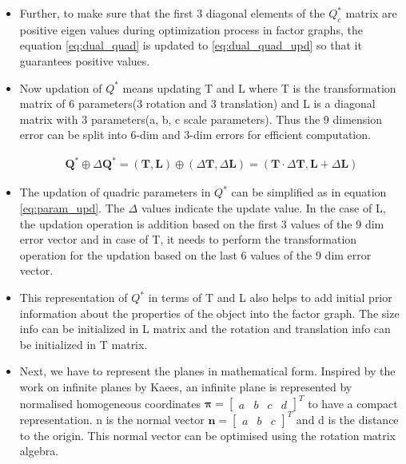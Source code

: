 \documentclass[report.tex]{subfiles}
\begin{document}
\begin{itemize}
\item Further, to make sure that the first 3 diagonal elements of the ${Q}_{c}^{*}$ matrix are positive eigen values during optimization process in factor graphs, the equation \ref{eq:dual_quad} is updated to \ref{eq:dual_quad_upd} so that it guarantees positive values.
\item Now updation of ${Q}^{*}$ means updating T and L where T is the transformation matrix of 6 parameters(3 rotation and 3 translation) and L is a diagonal matrix with 3 parameters(a, b, c scale parameters). Thus the 9 dimension error can be split into 6-dim and 3-dim errors for efficient computation.

\begin{equation}
{
\begin{aligned}
\mathbf{Q}^{*} \oplus \Delta \mathbf{Q}^{*}=(\mathbf{T}, \mathbf{L}) \oplus(\Delta \mathbf{T}, \Delta \mathbf{L})=(\mathbf{T} \cdot \Delta \mathbf{T}, \mathbf{L}+\Delta \mathbf{L})
\end{aligned}
} \label{eq:param_upd}
\end{equation}

\item The updation of quadric parameters in ${Q}^{*}$ can be simplified as in equation \ref{eq:param_upd}. The $\Delta$ values indicate the update value. In the case of L, the updation operation is addition based on the first 3 values of the 9 dim error vector and in case of T, it needs to perform the transformation operation for the updation based on the last 6 values of the 9 dim error vector.
\item This representation of ${Q}^{*}$ in terms of T and L also helps to add initial prior information about the properties of the object into the factor graph. The size info can be initialized in L matrix and the rotation and translation info can be initialized in T matrix.

\item Next, we have to represent the planes in mathematical form. Inspired by the work on infinite planes by Kaees\cite{infiniteplanes}, an infinite plane is represented by normalised homogeneous coordinates $\mathbf{\pi}=
{\begin{bmatrix}
    a & b & c & d
\end{bmatrix}}^{T}
$ to have a compact representation. n is the normal vector 
$\mathbf{n}=
{\begin{bmatrix}
    a & b & c
\end{bmatrix}}^{T}
$ and d is the distance to the origin. This normal vector can be optimised using the rotation matrix algebra.


\end{itemize}
\end{document}
